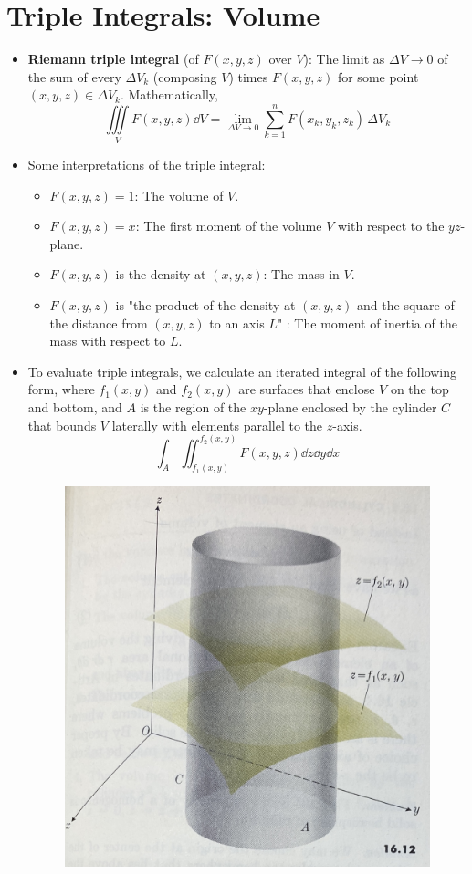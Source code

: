 \documentclass[../main.tex]{subfiles}
\begin{document}
\section{Triple Integrals: Volume}
\begin{itemize}
    \item \textbf{Riemann triple integral} (of $F(x,y,z)$ over $V$): The limit as $\Delta V\to 0$ of the sum of every $\Delta V_k$ (composing $V$) times $F(x,y,z)$ for some point $(x,y,z)\in \Delta V_k$. Mathematically,
    \begin{equation*}
        \iiint\limits_VF(x,y,z)\dd{V} = \lim_{\Delta V\to 0}\sum_{k=1}^nF(x_k,y_k,z_k)\, \Delta V_k
    \end{equation*}
    \item Some interpretations of the triple integral:
    \begin{itemize}
        \item $F(x,y,z)=1$: The volume of $V$.
        \item $F(x,y,z)=x$: The first moment of the volume $V$ with respect to the $yz$-plane.
        \item $F(x,y,z)$ is the density at $(x,y,z)$: The mass in $V$.
        \item $F(x,y,z)$ is "the product of the density at $(x,y,z)$ and the square of the distance from $(x,y,z)$ to an axis $L$" \parencite[558]{bib:Thomas}: The moment of inertia of the mass with respect to $L$.
    \end{itemize}
    \item To evaluate triple integrals, we calculate an iterated integral of the following form, where $f_1(x,y)$ and $f_2(x,y)$ are surfaces that enclose $V$ on the top and bottom, and $A$ is the region of the $xy$-plane enclosed by the cylinder $C$ that bounds $V$ laterally with elements parallel to the $z$-axis.
    \begin{equation*}
        \int_A\iint_{f_1(x,y)}^{f_2(x,y)}F(x,y,z)\dd{z}\dd{y}\dd{x}
    \end{equation*}
    \begin{figure}[h!]
        \centering
        \includegraphics[width=0.4\linewidth]{ExtFiles/tripleIntegral.jpg}

\end{figure}
\end{itemize}
\end{document}
